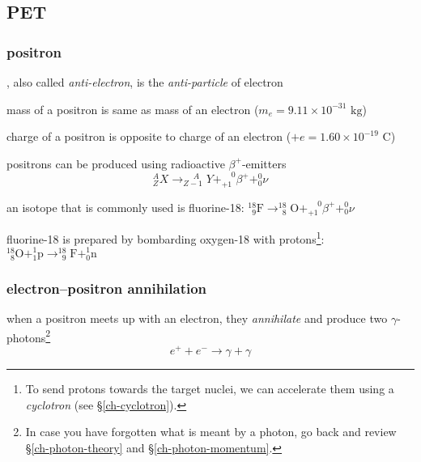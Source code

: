 
\newpage

\subsection{PET}

\subsubsection{positron}

, also called \emph{anti-electron}, is the \emph{anti-particle} of electron

\cmt mass of a positron is same as mass of an electron ($m_e = 9.11 \times 10^{-31} \text{ kg}$)

\cmt charge of a positron is opposite to charge of an electron ($+e = 1.60 \times 10^{-19} \text{ C}$)

\cmt positrons can be produced using radioactive $\beta^+$-emitters
\begin{equation*}
	^A_Z X \longrightarrow ^{\phantom{-1}A}_{Z-1} Y + ^{\phantom{+}0}_{+1} \beta^+ + ^0_0 \nu
\end{equation*}

an isotope that is commonly used is fluorine-18: $^{18}_{\phantom{1}9} \text{F} \longrightarrow ^{18}_{\phantom{1}8} \text{O} + ^{\phantom{+}0}_{+1} \beta^+ + ^0_0 \nu$

fluorine-18 is prepared by bombarding oxygen-18 with protons\footnote{To send protons towards the target nuclei, we can accelerate them using a \emph{cyclotron} (see \S\ref{ch-cyclotron}).}: $^{18}_{\phantom{1}8} \text{O} +  _1^1 \text{p} \longrightarrow  ^{18}_{\phantom{1}9} \text{F}  + _0^1 \text{n}$


\subsubsection{electron--positron annihilation} 

when a positron meets up with an electron, they \emph{annihilate} and produce two $\gamma$-photons\footnote{In case you have forgotten what is meant by a photon, go back and review \S\ref{ch-photon-theory} and \S\ref{ch-photon-momentum}.}
\begin{equation*}
	e^+ + e^- \longrightarrow \gamma + \gamma
\end{equation*}

